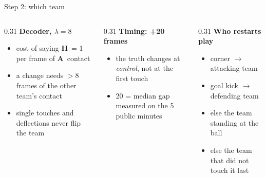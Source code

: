 \documentclass[aspectratio=169,10pt]{beamer}
\newcommand{\Hl}{\textcolor{cH}{\textbf{H}}}
\newcommand{\Al}{\textcolor{cA}{\textbf{A}}}
\begin{document}
\begin{frame}{Step 2: which team}
  \vspace{0.3cm}
  \begin{columns}[T]
    \begin{column}{0.31\textwidth}
      \textbf{Decoder, $\lambda=8$}
      \begin{itemize}\footnotesize
        \item cost of saying \Hl\ = 1 per frame of \Al\ contact
        \item a change needs $>$8 frames of the other team's contact
        \item single touches and deflections never flip the team
      \end{itemize}
    \end{column}
    \begin{column}{0.31\textwidth}
      \textbf{Timing: +20 frames}
      \begin{itemize}\footnotesize
        \item the truth changes at \emph{control}, not at the first touch
        \item 20 = median gap measured on the 5 public minutes
      \end{itemize}
    \end{column}
    \begin{column}{0.31\textwidth}
      \textbf{Who restarts play}
      \begin{itemize}\footnotesize
        \item corner $\to$ attacking team
        \item goal kick $\to$ defending team
        \item else the team standing at the ball
        \item else the team that did not touch it last
      \end{itemize}
    \end{column}
  \end{columns}
\end{frame}
\end{document}
